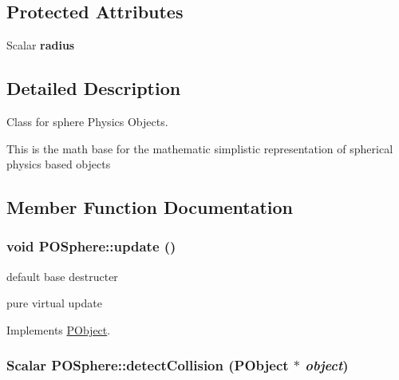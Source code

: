 \subsection*{Protected Attributes}
\begin{CompactItemize}
\item 
\hypertarget{classPOSphere_d9ae7837bb073b0e88c2def2b3b69412}{
Scalar \textbf{radius}}
\label{classPOSphere_d9ae7837bb073b0e88c2def2b3b69412}

\end{CompactItemize}


\subsection{Detailed Description}
Class for sphere Physics Objects. 

This is the math base for the mathematic simplistic representation of spherical physics based objects 

\subsection{Member Function Documentation}
\hypertarget{classPOSphere_17904f3eeceb2ba07931d6d359bbeebe}{
\subsubsection[update]{\setlength{\rightskip}{0pt plus 5cm}void POSphere::update ()}}
\label{classPOSphere_17904f3eeceb2ba07931d6d359bbeebe}


default base destructer 

pure virtual update 

Implements \hyperlink{classPObject_587e0263ce46133bf886729f890f9f2b}{PObject}.\hypertarget{classPOSphere_798625bc33390f84032dd30b5abaa112}{
\subsubsection[detectCollision]{\setlength{\rightskip}{0pt plus 5cm}Scalar POSphere::detectCollision ({\bf PObject} $\ast$ {\em object})}}
\label{classPOSphere_798625bc33390f84032dd30b5abaa112}


